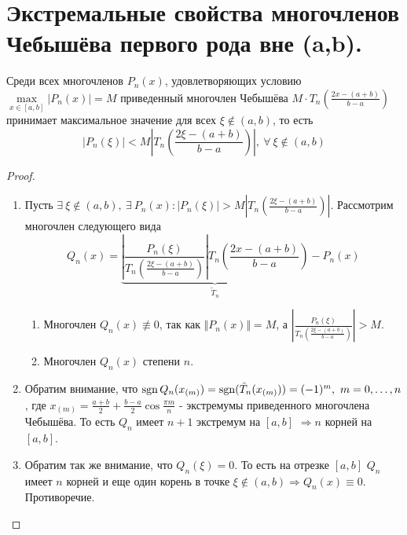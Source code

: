 \section{Экстремальные свойства многочленов Чебышёва
  первого рода вне (a,b).}

\begin{theorem}
  Среди всех многочленов $P_n(x)$, удовлетворяющих условию $\max\limits_{x\in[a,b]}|P_n(x)|=M$
  приведенный многочлен Чебышёва $M\cdot T_n\left(\frac{2x-(a+b)}{b-a}\right)$ принимает максимальное значение
  для всех $\xi\notin(a,b)$, то есть
  \[|P_n(\xi)|<M\left|T_n\left(\frac{2\xi-(a+b)}{b-a}\right)\right|,\ \forall\ \xi\notin(a,b)\]
\end{theorem}
\begin{proof}
  \begin{enumerate}
    \item Пусть $\exists\ \xi\notin(a,b),\ \exists\ P_n(x): |P_n(\xi)|>M\left|T_n\left(\frac{2\xi-(a+b)}{b-a}\right)\right|$. Рассмотрим многочлен следующего вида
          \[Q_n(x)=\underbrace{\left|\frac{P_n(\xi)}{T_n\left(\frac{2\xi-(a+b)}{b-a}\right)}\right|T_n\left(\frac{2x-(a+b)}{b-a}\right)}_{\tilde{T}_n} - P_n(x)\]
          \begin{enumerate}
            \item Многочлен $Q_n(x)\not\equiv0$, так как $\Vert P_n(x)\Vert=M$, а $\left|\frac{P_n(\xi)}{T_n\left(\frac{2\xi-(a+b)}{b-a}\right)}\right|>M$.
            \item Многочлен $Q_n(x)$ степени $n$.
          \end{enumerate}
    \item Обратим внимание, что $\operatorname{sgn} Q_n(x_{(m)})=\operatorname{sgn}(\tilde{T}_n(x_{(m)}))=(-1)^m,\ m=0,\ldots,n$, где $x_{(m)}=\frac{a+b}{2}+\frac{b-a}{2}\cos\frac{\pi m}{n}$
          - экстремумы приведенного многочлена Чебышёва. То есть $Q_n$ имеет $n+1$ экстремум на $[a,b]$ $\Rightarrow n$ корней на $[a,b]$.
    \item Обратим так же внимание, что $Q_n(\xi)=0$. То есть на отрезке $[a,b]$
          $Q_n$ имеет $n$ корней и еще один корень в точке $\xi\notin(a,b)\Rightarrow Q_n(x)\equiv0$. Противоречие.
  \end{enumerate}
\end{proof}

